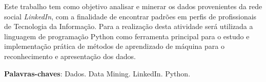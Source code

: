 \begin{resumo}[RESUMO]	
Este trabalho tem como objetivo analisar e minerar os dados provenientes da rede social \textit{LinkedIn}, com a finalidade de encontrar padrões em perfis de profissionais de Tecnologia da Informação. Para a realização desta atividade será utilizada a linguagem de programação Python como ferramenta principal para o estudo e implementação prática de métodos de aprendizado de máquina para o reconhecimento e apresentação dos dados.


 \vspace{\onelineskip}
    
 \noindent
 \textbf{Palavras-chaves}: Dados. Data Mining. LinkedIn. Python.
\end{resumo}
